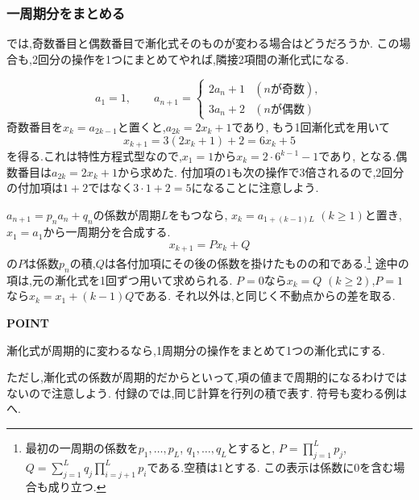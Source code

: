   \subsubsection{一周期分をまとめる}\label{節：一周期分をまとめる}
  では,奇数番目と偶数番目で漸化式そのものが変わる場合はどうだろうか.
  この場合も,2回分の操作を1つにまとめてやれば,隣接2項間の漸化式になる.
  
  \[
    a_1=1,\qquad
    a_{n+1}=\begin{cases}
      2a_n+1&(n\text{が奇数}),\\
      3a_n+2&(n\text{が偶数})
    \end{cases}
  \]
  奇数番目を$x_k=a_{2k-1}$と置くと,$a_{2k}=2x_k+1$であり,
  もう1回漸化式を用いて
  \[
    x_{k+1}=3(2x_k+1)+2=6x_k+5
  \]
  を得る.これは特性方程式型なので,$x_1=1$から$x_k=2\cdot6^{k-1}-1$であり,
  \BookMathLayout{\[
      a_{2k-1}=2\cdot6^{k-1}-1,\qquad
      a_{2k}=4\cdot6^{k-1}-1\quad(k\ge1)
    \]}{\[
      \begin{aligned}
        a_{2k-1}&=2\cdot6^{k-1}-1,\\
        a_{2k}&=4\cdot6^{k-1}-1\quad(k\ge1)
      \end{aligned}
    \]}
  となる.偶数番目は$a_{2k}=2x_k+1$から求めた.
  付加項の$1$も次の操作で3倍されるので,2回分の付加項は$1+2$ではなく$3\cdot1+2=5$になることに注意しよう.
  
  $a_{n+1}=p_na_n+q_n$の係数が周期$L$をもつなら,
  $x_k=a_{1+(k-1)L}$ $(k\ge1)$と置き,$x_1=a_1$から一周期分を合成する.
  \[
    x_{k+1}=Px_k+Q
  \]
  の$P$は係数$p_n$の積,$Q$は各付加項にその後の係数を掛けたものの和である.\footnote{最初の一周期の係数を$p_1,\ldots,p_L$, $q_1,\ldots,q_L$とすると,
    $P=\prod_{j=1}^L p_j$, $Q=\sum_{j=1}^L q_j\prod_{i=j+1}^L p_i$である.空積は$1$とする.
    この表示は係数に$0$を含む場合も成り立つ.}
  途中の項は,元の漸化式を1回ずつ用いて求められる.
  $P=0$なら$x_k=Q$ $(k\ge2)$,$P=1$なら$x_k=x_1+(k-1)Q$である.
  それ以外は,と同じく不動点からの差を取る.
  
  \begin{bookpoint}
    \textbf{POINT}\par
    漸化式が周期的に変わるなら,1周期分の操作をまとめて1つの漸化式にする.
  \end{bookpoint}
  ただし,漸化式の係数が周期的だからといって,項の値まで周期的になるわけではないので注意しよう.
  付録のでは,同じ計算を行列の積で表す.
  符号も変わる例はへ.
